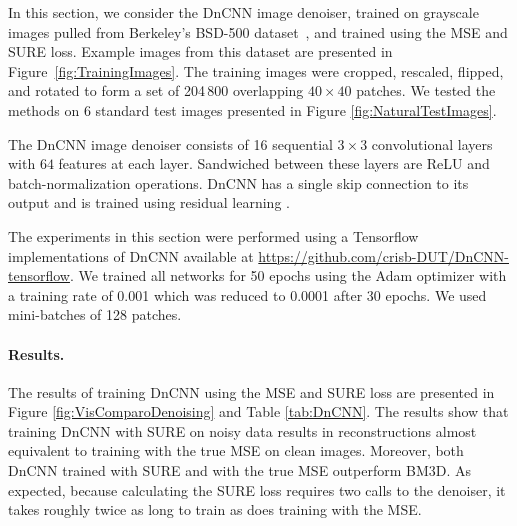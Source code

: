 \documentclass{article}
\begin{document}
\begin{figure}[t]
\end{figure}In this section, we consider the DnCNN image denoiser, trained on grayscale images pulled from Berkeley's BSD-500 dataset~\cite{BSDDataset}, and trained using the MSE and SURE loss. Example images from this dataset are presented in Figure~\ref{fig:TrainingImages}. 
The training images were cropped, rescaled, flipped, and rotated to form a set of 204\,800 overlapping $40\times 40$ patches. %
We tested the methods on 6 standard test images presented in Figure \ref{fig:NaturalTestImages}. %

The DnCNN image denoiser \cite{DnCNN} consists of 16 sequential $3\times 3$ convolutional layers with $64$ features at each layer. Sandwiched between these layers are ReLU and batch-normalization operations. DnCNN has a single skip connection to its output and is trained using residual learning \cite{residuallearning}.

The experiments in this section were performed using a Tensorflow implementations of DnCNN available at \url{https://github.com/crisb-DUT/DnCNN-tensorflow}.
We trained all networks for 50 epochs using the Adam optimizer \cite{ADAMopt} with a training rate of 0.001 which was reduced to 0.0001 after 30 epochs. We used mini-batches of 128 patches. 

\paragraph{Results.}%
The results of training DnCNN using the MSE and SURE loss are presented in Figure \ref{fig:VisComparoDenoising} and Table \ref{tab:DnCNN}. 
The results show that training DnCNN with SURE on noisy data results in reconstructions almost equivalent to training with the true MSE on clean images. Moreover, both DnCNN trained with SURE and with the true MSE outperform BM3D. As expected, because calculating the SURE loss requires two calls to the denoiser, it takes roughly twice as long to train as does training with the MSE.
\end{document}
